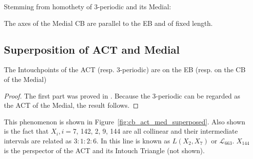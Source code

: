 Stemming from homothety of 3-periodic and its Medial:

\begin{remark}
The axes of the Medial CB are parallel to the EB and of fixed length.
\end{remark}

\subsection{Superposition of ACT and Medial}

\begin{proposition}
The Intouchpoints of the ACT (resp. 3-periodic) are on the EB (resp. on the CB of the Medial)
\end{proposition}

\begin{proof}
The first part was proved in \cite[Thm. 2]{reznik2020-ballet}. Because the 3-periodic can be regarded as the ACT of the Medial, the result follows.
\end{proof}

This phenomenon is shown in Figure~\ref{fig:cb_act_med_superposed}. Also shown is the fact that $X_i,i=$7, 142, 2, 9, 144 are all collinear and their intermediate intervals are related as $3:1:2:6$. In \cite{etc_central_lines} this line is known as $L(X_2,X_7)$ or $\mathcal{L}_{663}$. $X_{144}$ is the perspector of the ACT and its Intouch Triangle (not shown).


